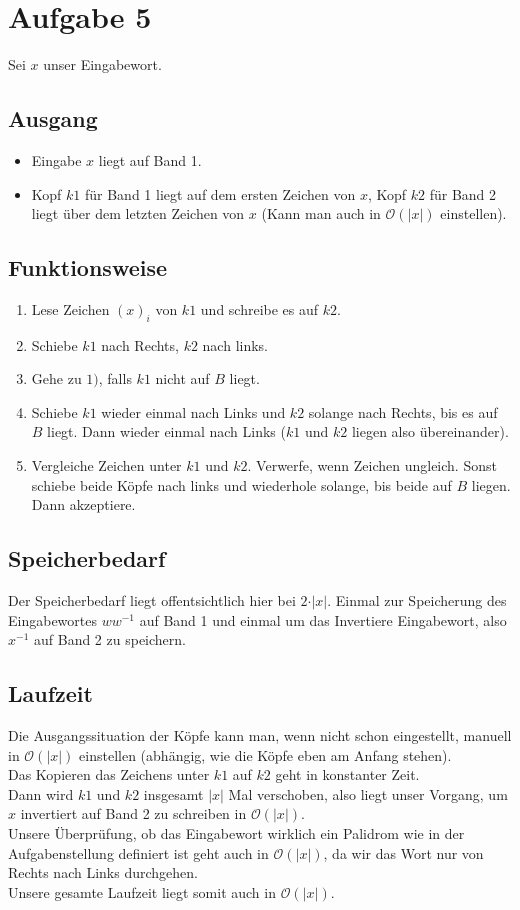 \documentclass[a4paper,11pt]{scrartcl}
\begin{document}
	
	\section*{Aufgabe 5}
	Sei $x$ unser Eingabewort.
	\subsection*{Ausgang}
		\begin{itemize}
		\item Eingabe $x$ liegt auf Band 1.
		\item Kopf $k1$ für Band 1 liegt auf dem ersten Zeichen von $x$, Kopf $k2$ für Band 2 liegt über dem letzten Zeichen von $x$ (Kann man auch in $\mathcal{O} (\vert x \vert )$ einstellen).
		\end{itemize}
	\subsection*{Funktionsweise}
		\begin{enumerate}[label=\arabic*.]
		\item Lese Zeichen $(x)_i$ von $k1$ und schreibe es auf $k2$.
		\item Schiebe $k1$ nach Rechts, $k2$ nach links.
		\item Gehe zu $1)$, falls $k1$ nicht auf $B$ liegt.
		\item Schiebe $k1$ wieder einmal nach Links und $k2$ solange nach Rechts, bis es auf $B$ liegt. Dann wieder einmal nach Links ($k1$ und $k2$ liegen also übereinander).
		\item Vergleiche Zeichen unter $k1$ und $k2$. Verwerfe, wenn Zeichen ungleich. Sonst schiebe beide Köpfe nach links und wiederhole solange, bis beide auf $B$ liegen. Dann akzeptiere.
		\end{enumerate}
	\subsection*{Speicherbedarf}
		Der Speicherbedarf liegt offentsichtlich hier bei $2\cdot \vert x \vert$. Einmal zur Speicherung des Eingabewortes $ ww^{-1}$ auf Band 1 und einmal um das Invertiere Eingabewort, also $x^{-1}$ auf Band 2 zu speichern.
	\subsection*{Laufzeit}
		Die Ausgangssituation der Köpfe kann man, wenn nicht schon eingestellt, manuell in $\mathcal{O} (\vert x \vert )$ einstellen (abhängig, wie die Köpfe eben am Anfang stehen). \\
		Das Kopieren das Zeichens unter $k1$ auf $k2$ geht in konstanter Zeit. \\
		Dann wird $k1$ und $k2$ insgesamt $\vert x \vert$ Mal verschoben, also liegt unser Vorgang, um $x$ invertiert auf Band 2 zu schreiben in $\mathcal{O} (\vert x \vert )$. \\
		Unsere Überprüfung, ob das Eingabewort wirklich ein Palidrom wie in der Aufgabenstellung definiert ist geht auch in $\mathcal{O} (\vert x \vert )$, da wir das Wort nur von Rechts nach Links durchgehen.\\
		Unsere gesamte Laufzeit liegt somit auch in $\mathcal{O} (\vert x \vert )$.
	
\end{document}
